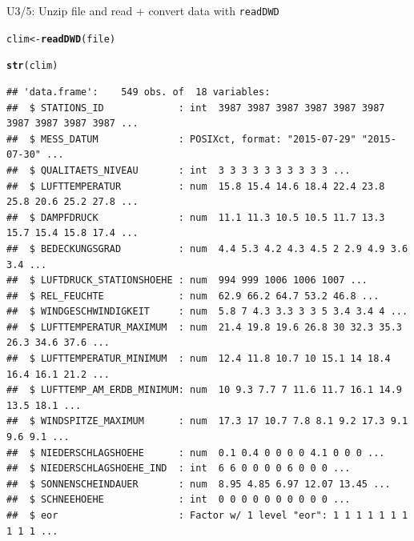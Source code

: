 \documentclass[compress, xcolor=dvipsnames]{beamer}\usepackage[]{graphicx}\usepackage[]{color}
\makeatletter
\newcommand{\hlstd}[1]{\textcolor[rgb]{0.345,0.345,0.345}{#1}}%
\newcommand{\hlkwb}[1]{\textcolor[rgb]{0.69,0.353,0.396}{#1}}%
\newcommand{\hlkwd}[1]{\textcolor[rgb]{0.737,0.353,0.396}{\textbf{#1}}}%
\newenvironment{kframe}{%
 \def\at@end@of@kframe{}%
 \ifinner\ifhmode%
  \def\at@end@of@kframe{\end{minipage}}%
  \begin{minipage}{\columnwidth}%
 \fi\fi%
 \def\FrameCommand##1{\hskip\@totalleftmargin \hskip-\fboxsep
 \colorbox{shadecolor}{##1}\hskip-\fboxsep
     \hskip-\linewidth \hskip-\@totalleftmargin \hskip\columnwidth}%
 \MakeFramed {\advance\hsize-\width
   \@totalleftmargin\z@ \linewidth\hsize
   \@setminipage}}%
 {\par\unskip\endMakeFramed%
 \at@end@of@kframe}
\newenvironment{knitrout}{}{} %
\makeatother
\begin{document}
\begin{frame}[fragile]{U3/5: Unzip file and read + convert data with \texttt{readDWD}}
\label{ur}
\pause
\begin{knitrout}
\color{fgcolor}\begin{kframe}
\begin{alltt}
\hlstd{clim} \hlkwb{<-} \hlkwd{readDWD}\hlstd{(file)}
\end{alltt}
\end{kframe}
\end{knitrout}
\pause
\begin{knitrout}\tiny
{}\color{fgcolor}\begin{kframe}
\begin{alltt}
\hlkwd{str}\hlstd{(clim)}
\end{alltt}
\begin{verbatim}
## 'data.frame':	549 obs. of  18 variables:
##  $ STATIONS_ID             : int  3987 3987 3987 3987 3987 3987 3987 3987 3987 3987 ...
##  $ MESS_DATUM              : POSIXct, format: "2015-07-29" "2015-07-30" ...
##  $ QUALITAETS_NIVEAU       : int  3 3 3 3 3 3 3 3 3 3 ...
##  $ LUFTTEMPERATUR          : num  15.8 15.4 14.6 18.4 22.4 23.8 25.8 20.6 25.2 27.8 ...
##  $ DAMPFDRUCK              : num  11.1 11.3 10.5 10.5 11.7 13.3 15.7 15.4 15.8 17.4 ...
##  $ BEDECKUNGSGRAD          : num  4.4 5.3 4.2 4.3 4.5 2 2.9 4.9 3.6 3.4 ...
##  $ LUFTDRUCK_STATIONSHOEHE : num  994 999 1006 1006 1007 ...
##  $ REL_FEUCHTE             : num  62.9 66.2 64.7 53.2 46.8 ...
##  $ WINDGESCHWINDIGKEIT     : num  5.8 7 4.3 3.3 3 3 5 3.4 3.4 4 ...
##  $ LUFTTEMPERATUR_MAXIMUM  : num  21.4 19.8 19.6 26.8 30 32.3 35.3 26.3 34.6 37.6 ...
##  $ LUFTTEMPERATUR_MINIMUM  : num  12.4 11.8 10.7 10 15.1 14 18.4 16.4 16.1 21.2 ...
##  $ LUFTTEMP_AM_ERDB_MINIMUM: num  10 9.3 7.7 7 11.6 11.7 16.1 14.9 13.5 18.1 ...
##  $ WINDSPITZE_MAXIMUM      : num  17.3 17 10.7 7.8 8.1 9.2 17.3 9.1 9.6 9.1 ...
##  $ NIEDERSCHLAGSHOEHE      : num  0.1 0.4 0 0 0 0 4.1 0 0 0 ...
##  $ NIEDERSCHLAGSHOEHE_IND  : int  6 6 0 0 0 0 6 0 0 0 ...
##  $ SONNENSCHEINDAUER       : num  8.95 4.85 6.97 12.07 13.45 ...
##  $ SCHNEEHOEHE             : int  0 0 0 0 0 0 0 0 0 0 ...
##  $ eor                     : Factor w/ 1 level "eor": 1 1 1 1 1 1 1 1 1 1 ...
\end{verbatim}
\end{kframe}
\end{knitrout}
\end{frame}
\end{document}
